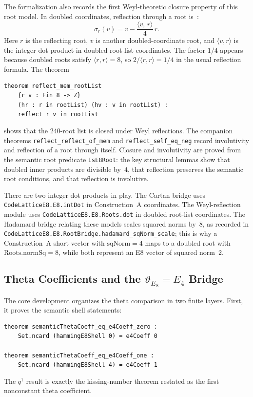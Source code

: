 \documentclass[12pt]{article}
\theoremstyle{definition}
\newcommand{\lean}[1]{\texttt{#1}}
\newcommand{\Theta}{\vartheta}
\begin{document}
The formalization also records the first Weyl-theoretic closure property of
this root model.  In doubled coordinates, reflection through a root is~\cite{Bourbaki2002}:
\[
  \sigma_r(v) = v - \frac{\langle v,\, r\rangle}{4}\,r.
\]
Here \(r\) is the reflecting root, \(v\) is another doubled-coordinate root, and
\(\langle v,r\rangle\) is the integer dot product in doubled root-list
coordinates.  The factor \(1/4\) appears because doubled roots satisfy
\(\langle r,r\rangle=8\), so \(2/\langle r,r\rangle=1/4\) in the usual
reflection formula.
The theorem
\begin{lstlisting}[style=lean]
theorem reflect_mem_rootList
    {r v : Fin 8 -> Z}
    (hr : r in rootList) (hv : v in rootList) :
    reflect r v in rootList
\end{lstlisting}
shows that the $240$-root list is closed under Weyl reflections.  The companion
theorems \lean{reflect\_reflect\_of\_mem} and \lean{reflect\_self\_eq\_neg}
record involutivity and reflection of a root through itself.  Closure and
involutivity are proved from the semantic root predicate \lean{IsE8Root}: the
key structural lemmas show that doubled inner products are divisible by~$4$,
that reflection preserves the semantic root conditions, and that reflection is
involutive.

There are two integer dot products in play.  The Cartan bridge uses
\lean{CodeLatticeE8.E8.intDot} in Construction~A coordinates.  The
Weyl-reflection module uses \lean{CodeLatticeE8.E8.Roots.dot} in doubled
root-list coordinates.  The Hadamard bridge relating these models scales squared
norms by~$8$, as recorded in
\lean{CodeLatticeE8.E8.RootBridge.hadamard\_sqNorm\_scale}; this is why a
Construction~A short vector with $\mathrm{sqNorm} = 4$ maps to a doubled root
with $\mathrm{Roots.normSq} = 8$, while both represent an E8 vector of squared
norm~$2$.

\subsection{Theta Coefficients and the $\Theta_{E_8} = E_4$ Bridge}

The core development organizes the theta comparison in two finite layers.  First,
it proves the semantic shell statements:
\begin{lstlisting}[style=lean]
theorem semanticThetaCoeff_eq_e4Coeff_zero :
    Set.ncard (hammingE8Shell 0) = e4Coeff 0

theorem semanticThetaCoeff_eq_e4Coeff_one :
    Set.ncard (hammingE8Shell 4) = e4Coeff 1
\end{lstlisting}
The $q^1$ result is exactly the kissing-number theorem restated as the first
nonconstant theta coefficient.
\end{document}
